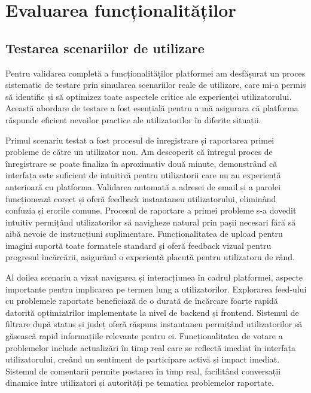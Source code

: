 \documentclass[12pt,a4paper]{report}
\begin{document}
\section{Evaluarea funcționalităților}

\subsection{Testarea scenariilor de utilizare}
Pentru validarea completă a funcționalităților platformei am desfășurat un proces sistematic de testare prin simularea scenariilor reale de utilizare, care mi-a permis să identific și să optimizez toate aspectele critice ale experienței utilizatorului. Această abordare  de testare a fost esențială pentru a mă asigurara că platforma răspunde eficient nevoilor practice ale utilizatorilor în diferite situații.

Primul scenariu testat a fost procesul de înregistrare și raportarea primei probleme de către un utilizator nou. Am descoperit că întregul proces de înregistrare se poate finaliza în aproximativ două minute, demonstrând că interfața este suficient de intuitivă pentru utilizatorii care nu au experiență anterioară cu platforma. Validarea automată a adresei de email și a parolei funcționează corect și oferă feedback instantaneu utilizatorului, eliminând confuzia și erorile comune. Procesul de raportare a primei probleme s-a dovedit intuitiv permițând utilizatorilor să navigheze natural prin pașii necesari fără să aibă nevoie de instrucțiuni suplimentare. Funcționalitatea de upload pentru imagini suportă toate formatele standard și oferă feedback vizual pentru progresul încărcării, asigurând o experiență placută pentru utilizatoru de rând.

Al doilea scenariu a vizat navigarea și interacțiunea în cadrul platformei, aspecte importante pentru implicarea pe termen lung a utilizatorilor. Explorarea feed-ului cu problemele raportate beneficiază de o durată de încărcare foarte rapidă datorită optimizărilor implementate la nivel de backend și frontend. Sistemul de filtrare după status și județ oferă răspuns instantaneu  permițând utilizatorilor să găsească rapid informațiile relevante pentru ei. Funcționalitatea de votare a problemelor include actualizări în timp real care se reflectă imediat în interfața utilizatorului, creând un sentiment de participare activă și impact imediat. Sistemul de comentarii permite postarea în timp real, facilitând conversații dinamice între utilizatori și autorități pe tematica problemelor raportate.
\end{document}
